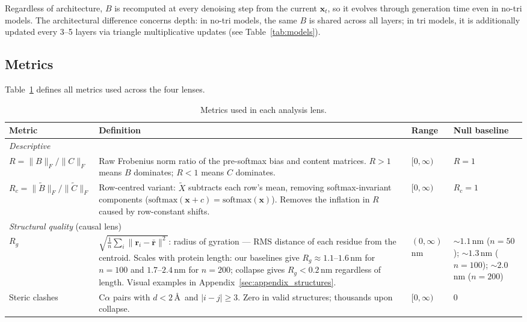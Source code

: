 \documentclass{article}
\begin{document}
Regardless of architecture, $B$ is recomputed at every denoising step from the current $\mathbf{x}_t$, so it evolves through generation time even in no-tri models.
The architectural difference concerns depth: in no-tri models, the same $B$ is shared across all layers; in tri models, it is additionally updated every 3--5 layers via triangle multiplicative updates (see Table~\ref{tab:models}).

\subsection{Metrics}

Table~\ref{tab:metrics} defines all metrics used across the four lenses.

\begin{table}[h]
    \centering
    \caption{Metrics used in each analysis lens.}
    \label{tab:metrics}
    \begin{tabular}{p{2.5cm}p{7.2cm}p{1.6cm}p{2.2cm}}
        \toprule
        Metric & Definition & Range & Null baseline \\
        \midrule
        \multicolumn{4}{l}{\emph{Descriptive}} \\[2pt]
        $R = \|B\|_F / \|C\|_F$ & Raw Frobenius norm ratio of the pre-softmax bias and content matrices. $R{>}1$ means $B$ dominates; $R{<}1$ means $C$ dominates. & $[0, \infty)$ & $R = 1$ \\[4pt]
        $R_c = \|\tilde{B}\|_F / \|\tilde{C}\|_F$ & Row-centred variant: $\tilde{X}$ subtracts each row's mean, removing softmax-invariant components ($\mathrm{softmax}(\mathbf{x} + c) = \mathrm{softmax}(\mathbf{x})$). Removes the inflation in $R$ caused by row-constant shifts. & $[0, \infty)$ & $R_c = 1$ \\[4pt]
        \midrule
        \multicolumn{4}{l}{\emph{Structural quality} (causal lens)} \\[2pt]
        $R_g$ & $\sqrt{\frac{1}{n}\sum_i \|\mathbf{r}_i - \bar{\mathbf{r}}\|^2}$: radius of gyration --- RMS distance of each residue from the centroid. Scales with protein length: our baselines give $R_g \approx 1.1$--$1.6$\,nm for $n{=}100$ and $1.7$--$2.4$\,nm for $n{=}200$; collapse gives $R_g < 0.2$\,nm regardless of length. Visual examples in Appendix~\ref{sec:appendix_structures}. & $(0, \infty)$ nm & ${\sim}1.1$\,nm ($n{=}50$); ${\sim}1.3$\,nm ($n{=}100$); ${\sim}2.0$\,nm ($n{=}200$) \\[4pt]
        Steric clashes & C$\alpha$ pairs with $d < 2$\,\AA\ and $|i{-}j| \geq 3$. Zero in valid structures; thousands upon collapse. & $[0, \infty)$ & 0 \\[4pt]

\end{tabular}
\end{table}
\end{document}
